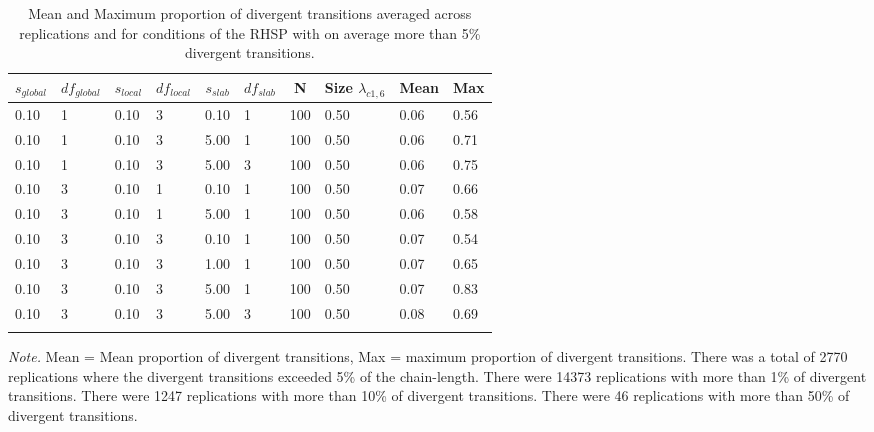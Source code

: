 \documentclass[
  man, donotrepeattitle,floatsintext]{apa6}
\begin{document}
\begin{table}[tbp]

\begin{center}
\begin{threeparttable}

\caption{\label{tab:unnamed-chunk-4}Mean and Maximum proportion of divergent transitions averaged across replications and for conditions of the RHSP with on average more than 5\% divergent transitions.}

\begin{tabular}{llllllllll}
\toprule
$s_{global}$ & \multicolumn{1}{c}{$df_{global}$} & \multicolumn{1}{c}{$s_{local}$} & \multicolumn{1}{c}{$df_{local}$} & \multicolumn{1}{c}{$s_{slab}$} & \multicolumn{1}{c}{$df_{slab}$} & \multicolumn{1}{c}{N} & \multicolumn{1}{c}{Size $\lambda_{c1 , 6}$} & \multicolumn{1}{c}{Mean} & \multicolumn{1}{c}{Max}\\
\midrule
0.10 & 1 & 0.10 & 3 & 0.10 & 1 & 100 & 0.50 & 0.06 & 0.56\\
0.10 & 1 & 0.10 & 3 & 5.00 & 1 & 100 & 0.50 & 0.06 & 0.71\\
0.10 & 1 & 0.10 & 3 & 5.00 & 3 & 100 & 0.50 & 0.06 & 0.75\\
0.10 & 3 & 0.10 & 1 & 0.10 & 1 & 100 & 0.50 & 0.07 & 0.66\\
0.10 & 3 & 0.10 & 1 & 5.00 & 1 & 100 & 0.50 & 0.06 & 0.58\\
0.10 & 3 & 0.10 & 3 & 0.10 & 1 & 100 & 0.50 & 0.07 & 0.54\\
0.10 & 3 & 0.10 & 3 & 1.00 & 1 & 100 & 0.50 & 0.07 & 0.65\\
0.10 & 3 & 0.10 & 3 & 5.00 & 1 & 100 & 0.50 & 0.07 & 0.83\\
0.10 & 3 & 0.10 & 3 & 5.00 & 3 & 100 & 0.50 & 0.08 & 0.69\\
\bottomrule
\addlinespace
\end{tabular}

\begin{tablenotes}[para]
\normalsize{\textit{Note.} Mean = Mean proportion of divergent transitions, Max = maximum proportion of divergent transitions. There was a total of 2770 replications where the divergent transitions exceeded 5\% of the chain-length. There were 14373 replications with more than 1\% of divergent transitions. There were 1247 replications with more than 10\% of divergent transitions. There were 46 replications with more than 50\% of divergent transitions.}
\end{tablenotes}

\end{threeparttable}
\end{center}

\end{table}
\end{document}
